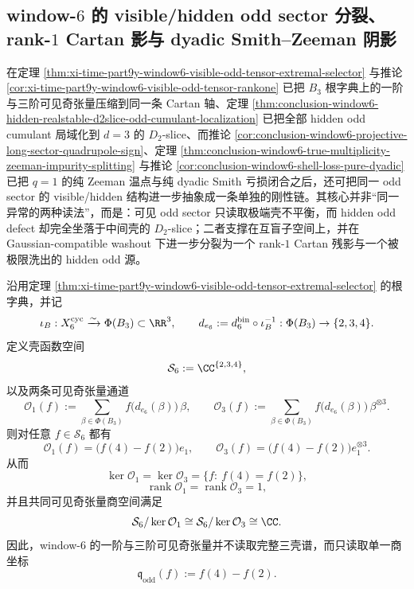 \subsection{window-\texorpdfstring{$6$}{6} 的 visible/hidden odd sector 分裂、rank-\texorpdfstring{$1$}{1} Cartan 影与 dyadic Smith--Zeeman 阴影}\label{subsec:conclusion-window6-visible-hidden-odd-dyadic-zeeman-shadow}

在定理 \ref{thm:xi-time-part9y-window6-visible-odd-tensor-extremal-selector} 与推论 \ref{cor:xi-time-part9y-window6-visible-odd-tensor-rankone} 已把 \(B_3\) 根字典上的一阶与三阶可见奇张量压缩到同一条 Cartan 轴、定理 \ref{thm:conclusion-window6-hidden-realstable-d2slice-odd-cumulant-localization} 已把全部 hidden odd cumulant 局域化到 \(d=3\) 的 \(D_2\)-slice、而推论 \ref{cor:conclusion-window6-projective-long-sector-quadrupole-sign}、定理 \ref{thm:conclusion-window6-true-multiplicity-zeeman-impurity-splitting} 与推论 \ref{cor:conclusion-window6-shell-loss-pure-dyadic} 已把 \(q=1\) 的纯 Zeeman 温点与纯 dyadic Smith 亏损闭合之后，还可把同一 odd sector 的 visible/hidden 结构进一步抽象成一条单独的刚性链。其核心并非“同一异常的两种读法”，而是：可见 odd sector 只读取极端壳不平衡，而 hidden odd defect 却完全坐落于中间壳的 \(D_2\)-slice；二者支撑在互盲子空间上，并在 Gaussian-compatible washout 下进一步分裂为一个 rank-\(1\) Cartan 残影与一个被极限洗出的 hidden odd 源。

\begin{theorem}[可见奇张量的共同一维商]\label{thm:conclusion-window6-visible-odd-common-quotient}
沿用定理 \ref{thm:xi-time-part9y-window6-visible-odd-tensor-extremal-selector} 的根字典，并记
\[
\iota_B:X_6^{\mathrm{cyc}}\xrightarrow{\sim}\Phi(B_3)\subset \RR^3,
\qquad
d_{e_6}:=d_6^{\mathrm{bin}}\circ \iota_B^{-1}:\Phi(B_3)\to\{2,3,4\}.
\]
定义壳函数空间
\[
\mathcal S_6:=\CC^{\{2,3,4\}},
\]
以及两条可见奇张量通道
\[
\mathcal O_1(f):=\sum_{\beta\in\Phi(B_3)}f\bigl(d_{e_6}(\beta)\bigr)\,\beta,
\qquad
\mathcal O_3(f):=\sum_{\beta\in\Phi(B_3)}f\bigl(d_{e_6}(\beta)\bigr)\,\beta^{\otimes 3}.
\]
则对任意 \(f\in \mathcal S_6\) 都有
\[
\mathcal O_1(f)=\bigl(f(4)-f(2)\bigr)e_1,
\qquad
\mathcal O_3(f)=\bigl(f(4)-f(2)\bigr)e_1^{\otimes 3}.
\]
从而
\[
\ker \mathcal O_1=\ker \mathcal O_3=\{f:\ f(4)=f(2)\},
\]
\[
\operatorname{rank}\mathcal O_1=\operatorname{rank}\mathcal O_3=1,
\]
并且共同可见奇张量商空间满足
\[
\mathcal S_6/\ker \mathcal O_1
\cong
\mathcal S_6/\ker \mathcal O_3
\cong
\CC.
\]
因此，window-\(6\) 的一阶与三阶可见奇张量并不读取完整三壳谱，而只读取单一商坐标
\[
\mathfrak q_{\mathrm{odd}}(f):=f(4)-f(2).
\]
\end{theorem}

